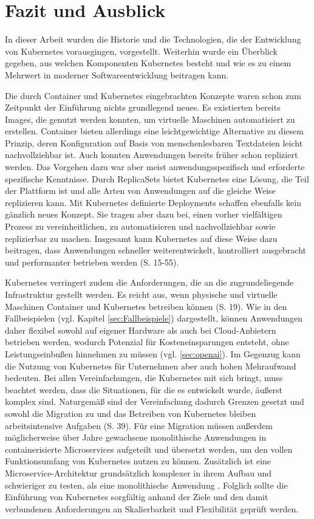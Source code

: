 \documentclass[11pt,a4paper]{article}
\begin{document}
\section{Fazit und Ausblick}
In dieser Arbeit wurden die Historie und die Technologien, die der Entwicklung von Kubernetes
vorausgingen, vorgestellt. Weiterhin wurde ein Überblick gegeben, aus welchen Komponenten
Kubernetes besteht und wie es zu einem Mehrwert in moderner Softwareentwicklung
beitragen kann.

Die durch Container und Kubernetes eingebrachten Konzepte waren schon zum Zeitpunkt der Einführung
nichts grundlegend neues.
Es existierten bereits Images, die genutzt werden konnten, um virtuelle Maschinen automatisiert
zu erstellen. Container bieten allerdings eine leichtgewichtige Alternative zu diesem Prinzip,
deren Konfiguration auf Basis von menschenlesbaren Textdateien leicht nachvollziehbar ist.
Auch konnten Anwendungen bereits früher schon repliziert werden.
Das Vorgehen dazu war aber meist anwendungsspezifisch und erforderte spezifische Kenntnisse.
Durch \mbox{ReplicaSets} bietet Kubernetes eine Lösung, die Teil der Plattform ist
und alle Arten von Anwendungen auf die gleiche Weise replizieren kann.
Mit Kubernetes definierte Deployments schaffen ebenfalls kein gänzlich neues Konzept.
Sie tragen aber dazu bei, einen vorher vielfältigen Prozess zu vereinheitlichen,
zu automatisieren und nachvollziehbar sowie replizierbar zu machen.
Insgesamt kann Kubernetes auf diese Weise dazu beitragen, dass
Anwendungen schneller weiterentwickelt, kontrolliert ausgebracht und
performanter betrieben werden \cite{Schmeling_Dargatz_2022} (S. 15-55).

Kubernetes verringert zudem die Anforderungen, die an die zugrundeliegende
Infrastruktur gestellt werden. Es reicht aus, wenn physische und virtuelle Maschinen
Container und Kubernetes betreiben können \cite{cicd_with_kubernetes_devops} (S. 19).
Wie in den Fallbeispielen (vgl. Kapitel \ref{sec:Fallbeispiele}) dargestellt, können Anwendungen daher
flexibel sowohl auf eigener Hardware als auch bei Cloud-Anbietern betrieben werden,
wodurch Potenzial für Kosteneinsparungen entsteht, ohne Leistungseinbußen
hinnehmen zu müssen (vgl. \ref{sec:openai}).
Im Gegenzug kann die Nutzung von Kubernetes für Unternehmen aber auch
hohen Mehraufwand bedeuten.
Bei allen Vereinfachungen, die Kubernetes mit sich bringt, muss beachtet werden,
dass die Situationen, für die es entwickelt wurde, äußerst komplex sind.
Naturgemäß sind der Vereinfachung dadurch Grenzen gesetzt und
sowohl die Migration zu und das Betreiben von Kubernetes bleiben
arbeitsintensive Aufgaben \cite{domingus2022cloud} (S. 39).
Für eine Migration müssen außerdem möglicherweise über Jahre gewachsene monolithische
Anwendungen in containerisierte Microservices aufgeteilt und übersetzt werden,
um den vollen Funktionsumfang von Kubernetes nutzen zu können.
Zusätzlich ist eine Microservice-Architektur grundsätzlich komplexer
in ihrem Aufbau und schwieriger zu testen, als eine monolithische Anwendung \cite{8406008}.
Folglich sollte die Einführung von Kubernetes sorgfältig anhand der Ziele
und den damit verbundenen Anforderungen an Skalierbarkeit und Flexibilität
geprüft werden.
\end{document}
